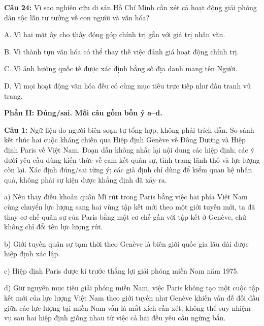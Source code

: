 \documentclass[12pt,a4paper]{article}
\begin{document}
\par\noindent\begin{minipage}{\linewidth}
\noindent\textbf{Câu 24:} Vì sao nghiên cứu di sản Hồ Chí Minh cần xét cả hoạt động giải phóng dân tộc lẫn tư tưởng về con người và văn hóa?\par
\noindent A. Vì hai mặt ấy cho thấy đóng góp chính trị gắn với giá trị nhân văn.\par
\noindent B. Vì thành tựu văn hóa có thể thay thế việc đánh giá hoạt động chính trị.\par
\noindent C. Vì ảnh hưởng quốc tế được xác định bằng số địa danh mang tên Người.\par
\noindent D. Vì mọi hoạt động văn hóa đều có cùng mục tiêu trực tiếp như đấu tranh vũ trang.\par
\end{minipage}\par\vspace{0.12cm}

\textbf{Phần II: Đúng/sai. Mỗi câu gồm bốn ý a--d.}\par

\par\noindent\begin{minipage}{\linewidth}
\noindent\textbf{Câu 1:} Ngữ liệu do người biên soạn tự tổng hợp, không phải trích dẫn. So sánh kết thúc hai cuộc kháng chiến qua Hiệp định Genève về Đông Dương và Hiệp định Paris về Việt Nam. Đoạn dẫn không nhắc lại nội dung các hiệp định; các ý dưới yêu cầu dùng kiến thức về cam kết quân sự, tình trạng lãnh thổ và lực lượng còn lại. Xác định đúng/sai từng ý; các giả định chỉ dùng để kiểm quan hệ nhân quả, không phải sự kiện được khẳng định đã xảy ra.\par
\noindent a) Nếu thay điều khoản quân Mĩ rút trong Paris bằng việc hai phía Việt Nam cùng chuyển lực lượng sang hai vùng tập kết mới theo một giới tuyến mới, ta đã thay cơ chế quân sự của Paris bằng một cơ chế gần với tập kết ở Genève, chứ không chỉ đổi tên lực lượng rút.\par
\noindent b) Giới tuyến quân sự tạm thời theo Genève là biên giới quốc gia lâu dài được hiệp định xác lập.\par
\noindent c) Hiệp định Paris được kí trước thắng lợi giải phóng miền Nam năm 1975.\par
\noindent d) Giữ nguyên mục tiêu giải phóng miền Nam, việc Paris không tạo một cuộc tập kết mới của lực lượng Việt Nam theo giới tuyến như Genève khiến vấn đề đối đầu giữa các lực lượng tại miền Nam vẫn là mắt xích cần xét; không thể suy nhiệm vụ sau hai hiệp định giống nhau từ việc cả hai đều yêu cầu ngừng bắn.\par
\end{minipage}\par\vspace{0.12cm}
\end{document}
